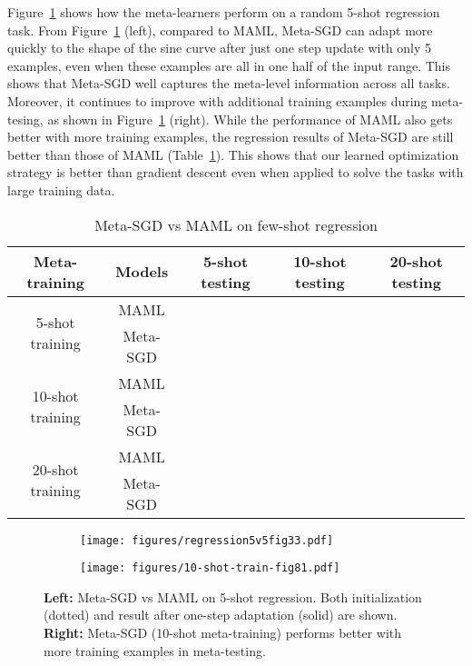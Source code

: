 \documentclass{article}
\begin{document}
Figure~\ref{fig:reg_curve} shows how the meta-learners perform on a random 5-shot regression task. From Figure~\ref{fig:reg_curve} (left), compared to MAML, Meta-SGD can adapt more quickly to the shape of the sine curve after just one step update with only 5 examples, even when these examples are all in one half of the input range. This shows that Meta-SGD well captures the meta-level information across all tasks. Moreover, it continues to improve with additional training examples during meta-tesing, as shown in Figure~\ref{fig:reg_curve} (right). While the performance of MAML also gets better with more training examples, the regression results of Meta-SGD are still better than those of MAML (Table~\ref{tab:res_regression_relu}). This shows that our learned optimization strategy is better than gradient descent even when applied to solve the tasks with large training data.

\begin{table}[t]
	\centering
	\begin{center}
		\caption{Meta-SGD vs MAML on few-shot regression}
				\vspace{0.1cm}
		\label{tab:res_regression_relu}
		\begin{tabular}{|c|c|c|c|c|}
			\hline
			Meta-training & Models & 5-shot testing & 10-shot testing & 20-shot testing \\
			\hline
			\multirow{2}{*}{5-shot training} & MAML &  &  &  \\
& Meta-SGD &  &  &  \\
			\hline
			\multirow{2}{*}{10-shot training} & MAML &  &  &  \\
& Meta-SGD &  &  &  \\
			\hline
			\multirow{2}{*}{20-shot training} & MAML &  &  &  \\
& Meta-SGD &  &  &  \\
			\hline
		\end{tabular}
	\end{center}
	\vspace{-0.5cm}
\end{table}

\begin{figure}[t]
	\centering
	\begin{subfigure}{0.49\textwidth}
		\centering
		\texttt{[image: figures/regression5v5fig33.pdf]}
	\end{subfigure}
	\begin{subfigure}{0.49\textwidth}
		\centering
		\texttt{[image: figures/10-shot-train-fig81.pdf]}
	\end{subfigure}
	
	\caption{\textbf{Left:} Meta-SGD vs MAML on 5-shot regression. Both initialization (dotted) and result after one-step adaptation (solid) are shown. \textbf{Right:} Meta-SGD (10-shot meta-training) performs better with more training examples in meta-testing. }
	\label{fig:reg_curve}\vspace{-0.0cm}
\end{figure}
\end{document}
